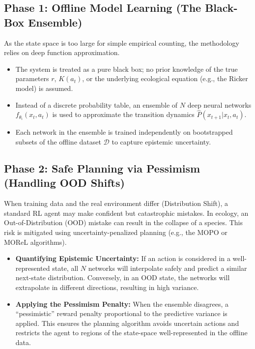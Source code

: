 \documentclass[11pt]{article}
\begin{document}
\subsection{Phase 1: Offline Model Learning (The Black-Box Ensemble)}
As the state space is too large for simple empirical counting, the methodology relies on deep function approximation.
\begin{itemize}
    \item The system is treated as a pure black box; no prior knowledge of the true parameters $r$, $K(a_t)$, or the underlying ecological equation (e.g., the Ricker model) is assumed.
    \item Instead of a discrete probability table, an ensemble of $N$ deep neural networks $f_{\theta_i}(x_t, a_t)$ is used to approximate the transition dynamics $\hat{P}(x_{t+1} | x_t, a_t)$.
    \item Each network in the ensemble is trained independently on bootstrapped subsets of the offline dataset $\mathcal{D}$ to capture epistemic uncertainty.
\end{itemize}

\subsection{Phase 2: Safe Planning via Pessimism (Handling OOD Shifts)}
When training data and the real environment differ (Distribution Shift), a standard RL agent may make confident but catastrophic mistakes. In ecology, an Out-of-Distribution (OOD) mistake can result in the collapse of a species. This risk is mitigated using uncertainty-penalized planning (e.g., the MOPO or MOReL algorithms).

\begin{itemize}
    \item \textbf{Quantifying Epistemic Uncertainty:} If an action is considered in a well-represented state, all $N$ networks will interpolate safely and predict a similar next-state distribution. Conversely, in an OOD state, the networks will extrapolate in different directions, resulting in high variance.
    \item \textbf{Applying the Pessimism Penalty:} When the ensemble disagrees, a ``pessimistic'' reward penalty proportional to the predictive variance is applied. This ensures the planning algorithm avoids uncertain actions and restricts the agent to regions of the state-space well-represented in the offline data.
\end{itemize}
\end{document}
